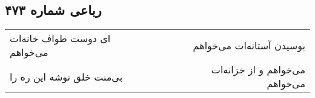 \begin{center}
\section*{رباعی شماره ۴۷۳}
\label{sec:sh473}
\begin{longtable}{l p{0.5cm} r}
ای دوست طواف خانه‌ات می‌خواهم
&&
بوسیدن آستانه‌ات می‌خواهم
\\
بی‌منت خلق توشه این ره را
&&
می‌خواهم و از خزانه‌ات می‌خواهم
\\
\end{longtable}
\end{center}
